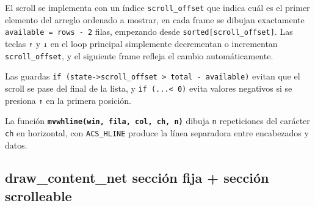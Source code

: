 \documentclass[12pt,letterpaper]{article}
\begin{document}
El scroll se implementa con un índice \texttt{scroll\_offset} que indica cuál es el primer elemento del arreglo
ordenado a mostrar, en cada frame se dibujan exactamente \texttt{available = rows - 2} filas, empezando desde
\texttt{sorted[scroll\_offset]}. Las teclas \texttt{↑} y \texttt{↓} en el loop principal simplemente
decrementan o incrementan \texttt{scroll\_offset}, y el siguiente frame refleja el cambio automáticamente.

\medskip

Las guardas \texttt{if (state->scroll\_offset > total - available)} evitan que el scroll se pase del final de
la lista, y \texttt{if (...< 0)} evita valores negativos si se presiona \texttt{↑} en la primera posición.

\medskip

La función \textbf{\texttt{mvwhline(win, fila, col, ch, n)}} dibuja \texttt{n} repeticiones del carácter
\texttt{ch} en horizontal, con \texttt{ACS\_HLINE} produce la línea separadora entre encabezados y datos.

\subsection*{draw\_content\_net sección fija + sección scrolleable}
\end{document}
